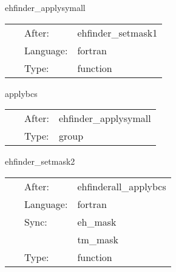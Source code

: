 \vspace{5mm}


\hspace{5mm} ehfinder\_applysymall 

\hspace{5mm}{\it select both f and eh\_mask for boundary conditions } 


\hspace{5mm}

 \begin{tabular*}{160mm}{cll} 
~ & After:  & ehfinder\_setmask1 \\ 
~ & Language:  & fortran \\ 
~ & Type:  & function \\ 
\end{tabular*} 


\vspace{5mm}


\hspace{5mm} applybcs 

\hspace{5mm}{\it apply boundary conditions (symmetries) } 


\hspace{5mm}

 \begin{tabular*}{160mm}{cll} 
~ & After:  & ehfinder\_applysymall \\ 
~ & Type:  & group \\ 
\end{tabular*} 


\vspace{5mm}


\hspace{5mm} ehfinder\_setmask2 

\hspace{5mm}{\it find excision boundaries } 


\hspace{5mm}

 \begin{tabular*}{160mm}{cll} 
~ & After:  & ehfinderall\_applybcs \\ 
~ & Language:  & fortran \\ 
~ & Sync:  & eh\_mask \\ 
~& ~ &tm\_mask\\ 
~ & Type:  & function \\ 
\end{tabular*} 


